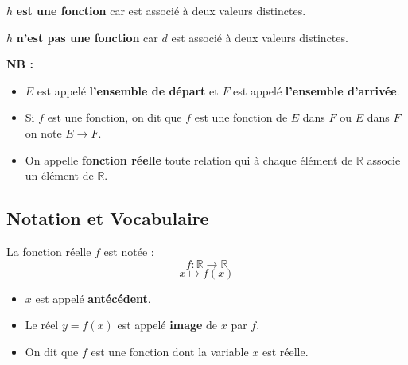 \documentclass[a4paper,12pt]{article}
\begin{document}
$h$ \textbf{est une fonction} car  est associé à deux valeurs distinctes.



$h$ \textbf{n'est pas une fonction} car $d$ est associé à deux valeurs distinctes.

\textbf{NB :}
\begin{itemize}
    \item \( E \) est appelé \textbf{l'ensemble de départ} et \( F \) est appelé \textbf{l'ensemble d'arrivée}.
    \item Si \( f \) est une fonction, on dit que \( f \) est une fonction de \( E \) dans \( F \) ou \( E \) dans \( F \) on note \( E \to F \).
    \item On appelle \textbf{fonction réelle} toute relation qui à chaque élément de \( \mathbb{R} \) associe un élément de \( \mathbb{R} \).
\end{itemize}

\subsection*{Notation et Vocabulaire}

La fonction réelle \( f \) est notée :
\[
    f : \mathbb{R} \to \mathbb{R}
\]
\[
    x \mapsto f(x)
\]

\begin{itemize}
    \item \( x \) est appelé \textbf{antécédent}.
    \item Le réel \( y = f(x) \) est appelé \textbf{image} de \( x \) par \( f \).
    \item On dit que \( f \) est une fonction dont la variable \( x \) est réelle.
\end{itemize}
\end{document}
